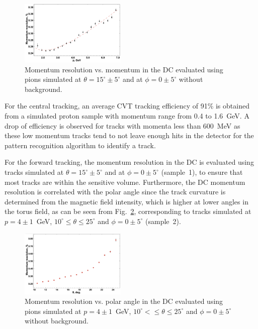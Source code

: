 \begin{figure}
\includegraphics[width=0.45\textwidth]{pics/DCRes.png}
\caption{Momentum resolution vs. momentum in the DC evaluated using pions simulated at
  $\theta =15^\circ \pm 5^\circ$ and at $\phi = 0 \pm 5^\circ$ without background.}
\label{fig:respdc}
\end{figure}

For the central tracking, an average CVT tracking efficiency of 91\% is obtained from a simulated proton sample with
momentum range from 0.4 to 1.6~GeV. A drop of efficiency is observed for tracks with momenta less than 600~MeV
as these low momentum tracks tend to not leave enough hits in the detector for the pattern recognition algorithm to
identify a track.  

For the forward tracking, the momentum resolution in the DC is evaluated using tracks simulated at
$\theta =15^\circ \pm 5^\circ$ and at $\phi = 0 \pm 5^\circ$ (sample~1), to ensure that most tracks are within the
sensitive volume. Furthermore, the DC momentum resolution is correlated with the polar angle since the track
curvature is determined from the magnetic field intensity, which is higher at lower angles in the torus field, as can
be seen from Fig.~\ref{fig:restheta}, corresponding to tracks simulated at $p=4\pm 1$~GeV,
$10^\circ \leq \theta \leq 25^\circ$ and $\phi = 0 \pm 5^\circ$ (sample~2).

\begin{figure}
\includegraphics[width=0.45\textwidth]{pics/DCRes2.png}
\caption{Momentum resolution vs. polar angle in the DC evaluated using pions simulated at $p=4\pm 1$~GeV,
  $10^\circ <\leq \theta \leq 25^\circ$ and $\phi = 0 \pm 5^\circ$ without background.}
\label{fig:restheta}
\end{figure}

